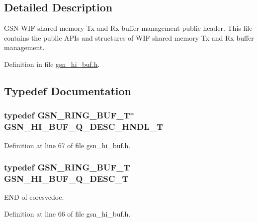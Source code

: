 \subsection{Detailed Description}
GSN WIF shared memory Tx and Rx buffer management public header. This file contains the public APIs and structures of WIF shared memory Tx and Rx buffer management. 

Definition in file \hyperlink{a00505_source}{gsn\_\-hi\_\-buf.h}.



\subsection{Typedef Documentation}
\hypertarget{a00505_a2b3143f617f573da4922c5888ce7ab72}{
\subsubsection[{GSN\_\-HI\_\-BUF\_\-Q\_\-DESC\_\-HNDL\_\-T}]{\setlength{\rightskip}{0pt plus 5cm}typedef {\bf GSN\_\-RING\_\-BUF\_\-T}$\ast$ {\bf GSN\_\-HI\_\-BUF\_\-Q\_\-DESC\_\-HNDL\_\-T}}}
\label{a00505_a2b3143f617f573da4922c5888ce7ab72}


Definition at line 67 of file gsn\_\-hi\_\-buf.h.

\hypertarget{a00505_a5592ee510b1e204faaca8ef7fa3fcf49}{
\subsubsection[{GSN\_\-HI\_\-BUF\_\-Q\_\-DESC\_\-T}]{\setlength{\rightskip}{0pt plus 5cm}typedef {\bf GSN\_\-RING\_\-BUF\_\-T} {\bf GSN\_\-HI\_\-BUF\_\-Q\_\-DESC\_\-T}}}
\label{a00505_a5592ee510b1e204faaca8ef7fa3fcf49}
END of coresvcdoc. 

Definition at line 66 of file gsn\_\-hi\_\-buf.h.

